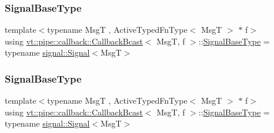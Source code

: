 \mbox{\label{structvt_1_1pipe_1_1callback_1_1_callback_bcast_a25891ab2b71bd3b3883df52172412607}} 
\subsubsection{\texorpdfstring{Signal\+Base\+Type}{SignalBaseType}\hspace{0.1cm}{\footnotesize\ttfamily [1/2]}}
{\footnotesize\ttfamily template$<$typename MsgT , Active\+Typed\+Fn\+Type$<$ Msg\+T $>$ $\ast$ f$>$ \\
using \hyperlink{structvt_1_1pipe_1_1callback_1_1_callback_bcast}{vt\+::pipe\+::callback\+::\+Callback\+Bcast}$<$ MsgT, f $>$\+::\hyperlink{structvt_1_1pipe_1_1callback_1_1_callback_bcast_a25891ab2b71bd3b3883df52172412607}{Signal\+Base\+Type} =  typename \hyperlink{structvt_1_1pipe_1_1signal_1_1_signal}{signal\+::\+Signal}$<$MsgT$>$}

\mbox{\label{structvt_1_1pipe_1_1callback_1_1_callback_bcast_a25891ab2b71bd3b3883df52172412607}} 
\subsubsection{\texorpdfstring{Signal\+Base\+Type}{SignalBaseType}\hspace{0.1cm}{\footnotesize\ttfamily [2/2]}}
{\footnotesize\ttfamily template$<$typename MsgT , Active\+Typed\+Fn\+Type$<$ Msg\+T $>$ $\ast$ f$>$ \\
using \hyperlink{structvt_1_1pipe_1_1callback_1_1_callback_bcast}{vt\+::pipe\+::callback\+::\+Callback\+Bcast}$<$ MsgT, f $>$\+::\hyperlink{structvt_1_1pipe_1_1callback_1_1_callback_bcast_a25891ab2b71bd3b3883df52172412607}{Signal\+Base\+Type} =  typename \hyperlink{structvt_1_1pipe_1_1signal_1_1_signal}{signal\+::\+Signal}$<$MsgT$>$}

